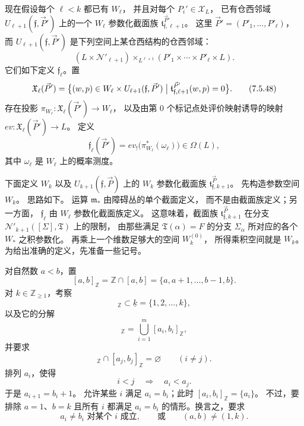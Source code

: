 现在假设每个 $\ell<k$ 都已有 $W_\ell$，
并且对每个 $P_i'\in\mathcal X_L$，
已有仓西邻域
$U_{\ell+1}(\mathfrak f,\vec P')$
上的一个 $W_\ell$ 参数化截面族
$\mathfrak t_{\mathfrak f,\ell+1}^{\vec P'}$。
这里
$\vec P'=(P'_1,\ldots,P'_\ell)$，
而 $U_{\ell+1}(\mathfrak f,\vec P')$
是下列空间上某仓西结构的仓西邻域：
\[
(L\times\mathcal N'_{\ell+1})
\mathbin{\times_{L^{\ell+1}}}
(P'_1\times\cdots\times P'_\ell\times L).
\]
它们如下定义 $\mathfrak f_\ell$。置
\begin{equation}
\mathfrak X_\ell(\vec P')
=\bigl\{(w,p)\in
W_\ell\times U_{\ell+1}(\mathfrak f,\vec P')
\bigm|
\mathfrak t_{\mathfrak f,\ell+1}^{\vec P'}(w,p)=0
\bigr\}.
\tag{7.5.48}\label{eq:7-5-48}
\end{equation}
存在投影
$\pi_{W_\ell}\colon\mathfrak X_\ell(\vec P')\to W_\ell$，
以及由第 $0$ 个标记点处评价映射诱导的映射
$ev\colon\mathfrak X_\ell(\vec P')\to L$。
定义
\begin{equation}
\mathfrak f_\ell(\vec P')
=ev_!\bigl(\pi_{W_\ell}^*(\omega_\ell)\bigr)
\in\Omega(L),
\tag{7.5.49}\label{eq:7-5-49}
\end{equation}
其中 $\omega_\ell$ 是 $W_\ell$ 上的概率测度。

下面定义 $W_k$ 以及
$U_{k+1}(\mathfrak f,\vec P)$ 上的
$W_k$ 参数化截面族
$\mathfrak t_{\mathfrak f,k+1}^{\vec P}$。
先构造参数空间 $W_k$。
思路如下。
运算 $\mathfrak m_*$ 由障碍丛的单个截面定义，
而不是由截面族定义；另一方面，
$\mathfrak f_\ell$ 由 $W_\ell$ 参数化截面族定义。
这意味着，截面族
$\mathfrak t_{\mathfrak f,k+1}^{\vec P}$
在分支
$\mathcal N'_{k+1}([\Sigma],\mathfrak T)$ 上的限制，
由那些满足 $\mathfrak T(\alpha)=F$ 的分支
$\Sigma_\alpha$ 所对应的各个 $W_*$ 之积参数化。
再乘上一个维数足够大的空间 $W_k^{(0)}$，
所得乘积空间就是 $W_k$。
为给出准确的定义，先准备一些记号。

对自然数 $a<b$，置
\[
[a,b]_{\mathbb Z}
=\mathbb Z\cap[a,b]
=\{a,a+1,\ldots,b-1,b\}.
\]
对 $k\in\mathbb Z_{\geq1}$，考察
\begin{equation}
[a,b]_{\mathbb Z}
\subset\underline{k}=\{1,2,\ldots,k\},
\tag{7.5.50.1}\label{eq:7-5-50-1}
\end{equation}
以及它的分解
\begin{equation}
[a,b]_{\mathbb Z}
=\bigcup_{i=1}^{m}[a_i,b_i]_{\mathbb Z},
\tag{7.5.50.2}\label{eq:7-5-50-2}
\end{equation}
并要求
\begin{equation}
[a_i,b_i]_{\mathbb Z}\cap[a_j,b_j]_{\mathbb Z}
=\varnothing
\qquad(i\neq j).
\tag{7.5.50.3}\label{eq:7-5-50-3}
\end{equation}
排列 $a_i$，使得
\begin{equation}
i<j\quad\Longrightarrow\quad a_i<a_j.
\tag{7.5.50.4}\label{eq:7-5-50-4}
\end{equation}
于是 $a_{i+1}=b_i+1$。
允许某些 $i$ 满足 $a_i=b_i$；此时
$[a_i,b_i]_{\mathbb Z}=\{a_i\}$。
不过，要排除 $a=1$、$b=k$ 且所有 $i$ 都满足
$a_i=b_i$ 的情形。换言之，要求
\begin{equation}
a_i\neq b_i\text{ 对某个 }i\text{ 成立},
\qquad\text{或}\qquad
(a,b)\neq(1,k).
\tag{7.5.50.5}\label{eq:7-5-50-5}
\end{equation}


